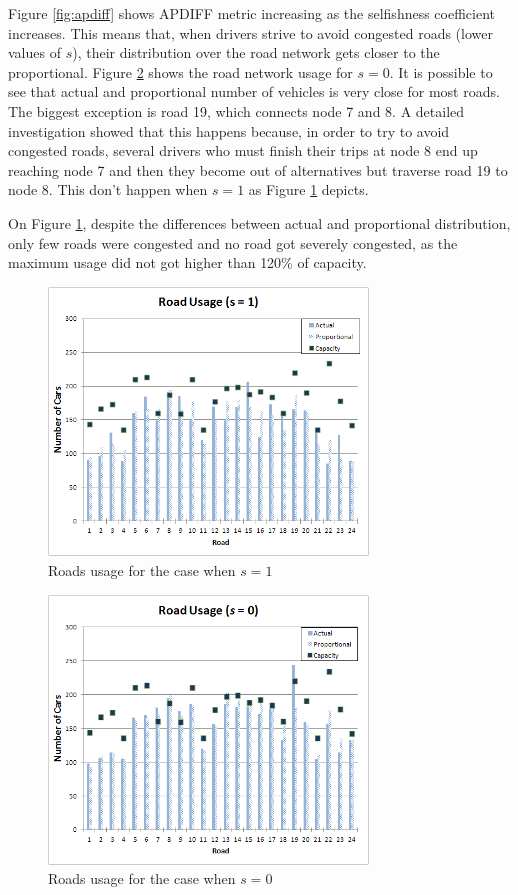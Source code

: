 \documentclass[12pt]{article}
\begin{document}
Figure \ref{fig:apdiff} shows APDIFF metric increasing as the selfishness coefficient increases. This means that, when drivers strive to avoid congested roads (lower values of $s$), their distribution over the road network gets closer to the proportional. Figure \ref{fig:roadsusage_s0} shows the road network usage for $s = 0$. It is possible to see that actual and proportional number of vehicles is very close for most roads. The biggest exception is road 19, which connects node 7 and 8. A detailed investigation showed that this happens because, in order to try to avoid congested roads, several drivers who must finish their trips at node 8 end up reaching node 7 and then they become out of alternatives but traverse road 19 to node 8. This don't happen when $s=1$ as Figure \ref{fig:roadsusage} depicts. 

On Figure \ref{fig:roadsusage}, despite the differences between actual and proportional distribution, only few roads were congested and no road got severely congested, as the maximum usage did not got higher than 120\% of capacity.

\begin{figure}[ht]
    \centerline{\includegraphics[width=8.5cm]{img/roadsUsage.png}}
    \caption{Roads usage for the case when $s=1$}
    \label{fig:roadsusage}

\end{figure}

\begin{figure}[ht]
    \centerline{\includegraphics[width=8.5cm]{img/roadsUsage_s0.png}}
    \caption{Roads usage for the case when $s=0$}
    \label{fig:roadsusage_s0}
\end{figure}
\end{document}
